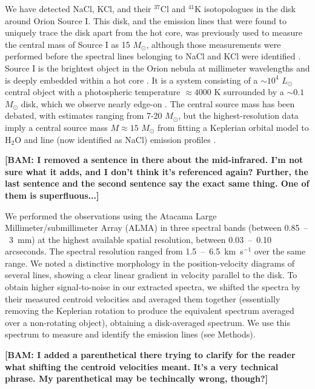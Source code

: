 \documentclass[12pt]{article}
\newcommand{\bam}[1]{\textcolor{green!65!black}{\textbf{[BAM: #1]}}}
\newcommand{\msun}{\ensuremath{M_{\odot}}\xspace}			%
\newcommand{\lsun}{\ensuremath{L_{\odot}}\xspace}			%
\newcommand{\water}{H$_{2}$O\xspace}		%
\newcommand{\kms}{\textrm{km~s}\ensuremath{^{-1}}\xspace}	%
\begin{document}
We have detected NaCl, KCl, and their $^{37}$Cl and $^{41}$K
isotopologues in the disk around Orion Source I.  This disk, and the emission lines that were found to uniquely trace the disk apart from the hot core, was previously used
to measure the central mass of Source I as 15 \msun, although those
measurements were performed before the spectral lines belonging to NaCl and KCl
were identified \cite{Ginsburg2018b}.  Source I is the brightest object in the
Orion nebula at millimeter wavelengths and is deeply embedded within a hot core
\cite{}. %
It is a system consisting of a
$\sim10^4$ \lsun central object with a photospheric temperature $\approx4000$ K
\cite{Testi2010a} surrounded by a $\sim0.1$ \msun disk, which we observe
nearly edge-on \cite{Plambeck2016a}.  The central source mass has been
debated, with estimates ranging from 7-20 \msun \cite{Matthews2010a,other},
but the highest-resolution data imply a central source mass $M\approx15$ \msun
from fitting a Keplerian orbital model to \water and line (now identified as
NaCl) emission profiles \cite{Ginsburg2018b}.

\bam{I removed a sentence in there about the mid-infrared.  I'm not sure what it adds, and I don't think it's referenced again?  Further, the last sentence and the second sentence say the exact same thing.  One of them is superfluous...}

We performed the observations using the Atacama Large Millimeter/submillimeter Array (ALMA) in three spectral bands (between 0.85~--~3~mm) at the highest
available spatial resolution, between 0.03~--~0.10 arcseconds. The
spectral resolution ranged from 1.5~--~6.5~\kms over the same range.  We noted a
distinctive morphology in the position-velocity diagrams of several lines,
showing a clear linear gradient in velocity parallel to the disk. To obtain
higher signal-to-noise in our extracted spectra, we shifted the spectra by
their measured centroid velocities and averaged them together (essentially removing  the Keplerian rotation to produce the equivalent spectrum averaged over a non-rotating object), obtaining a
disk-averaged spectrum.  We use this spectrum to measure and  identify the emission lines (see Methods).

\bam{I added a parenthetical there trying to clarify for the reader what shifting the centroid velocities meant.  It's a very technical phrase.  My parenthetical may be techincally wrong, though?}
\end{document}
